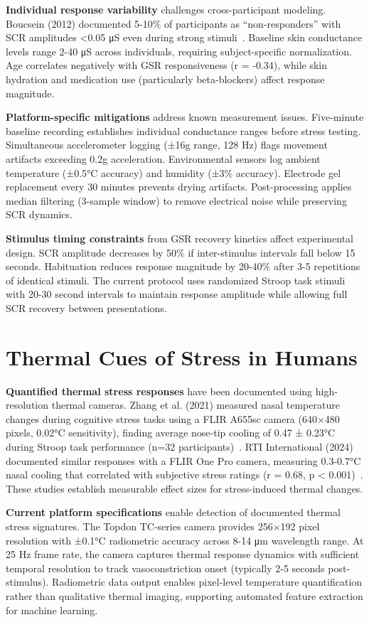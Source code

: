 \textbf{Individual response variability} challenges cross-participant modeling. Boucsein (2012) documented 5-10\% of participants as ``non-responders'' with SCR amplitudes <0.05 μS even during strong stimuli~\cite{boucsein2012electrodermal}. Baseline skin conductance levels range 2-40 μS across individuals, requiring subject-specific normalization. Age correlates negatively with GSR responsiveness (r = -0.34), while skin hydration and medication use (particularly beta-blockers) affect response magnitude.

\textbf{Platform-specific mitigations} address known measurement issues. Five-minute baseline recording establishes individual conductance ranges before stress testing. Simultaneous accelerometer logging (±16g range, 128 Hz) flags movement artifacts exceeding 0.2g acceleration. Environmental sensors log ambient temperature (±0.5°C accuracy) and humidity (±3\% accuracy). Electrode gel replacement every 30 minutes prevents drying artifacts. Post-processing applies median filtering (3-sample window) to remove electrical noise while preserving SCR dynamics.

\textbf{Stimulus timing constraints} from GSR recovery kinetics affect experimental design. SCR amplitude decreases by 50\% if inter-stimulus intervals fall below 15 seconds. Habituation reduces response magnitude by 20-40\% after 3-5 repetitions of identical stimuli. The current protocol uses randomized Stroop task stimuli with 20-30 second intervals to maintain response amplitude while allowing full SCR recovery between presentations.

\section{Thermal Cues of Stress in Humans}

\textbf{Quantified thermal stress responses} have been documented using high-resolution thermal cameras. Zhang et al. (2021) measured nasal temperature changes during cognitive stress tasks using a FLIR A655sc camera (640×480 pixels, 0.02°C sensitivity), finding average nose-tip cooling of 0.47 ± 0.23°C during Stroop task performance (n=32 participants)~\cite{zhang2021human}. RTI International (2024) documented similar responses with a FLIR One Pro camera, measuring 0.3-0.7°C nasal cooling that correlated with subjective stress ratings (r = 0.68, p < 0.001)~\cite{rti2025thermal}. These studies establish measurable effect sizes for stress-induced thermal changes.

\textbf{Current platform specifications} enable detection of documented thermal stress signatures. The Topdon TC-series camera provides 256×192 pixel resolution with ±0.1°C radiometric accuracy across 8-14 μm wavelength range. At 25 Hz frame rate, the camera captures thermal response dynamics with sufficient temporal resolution to track vasoconstriction onset (typically 2-5 seconds post-stimulus). Radiometric data output enables pixel-level temperature quantification rather than qualitative thermal imaging, supporting automated feature extraction for machine learning.

